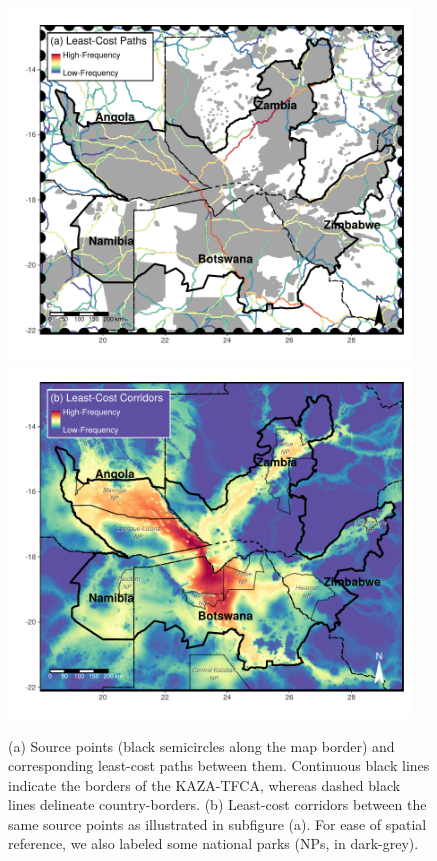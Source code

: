 \documentclass[abstract=on,10pt,a4paper,bibliography=totocnumbered]{article}
\begin{document}
\begin{figure}[hbtp]
  \begin{center}
    \begin{minipage}{0.95\textwidth}
      \includegraphics[width = 0.95\textwidth]{99_LeastCostPaths.pdf}
      \includegraphics[width = 0.95\textwidth]{99_LeastCostCorrs.pdf}
    \end{minipage}
    \caption{(a) Source points (black semicircles along the map border) and
    corresponding least-cost paths between them. Continuous black lines indicate
    the borders of the KAZA-TFCA, whereas dashed black lines delineate
    country-borders. (b) Least-cost corridors between the same source points as
    illustrated in subfigure (a). For ease of spatial reference, we also labeled
    some national parks (NPs, in dark-grey).}
    \label{LeastCost}
  \end{center}
\end{figure}
\end{document}
